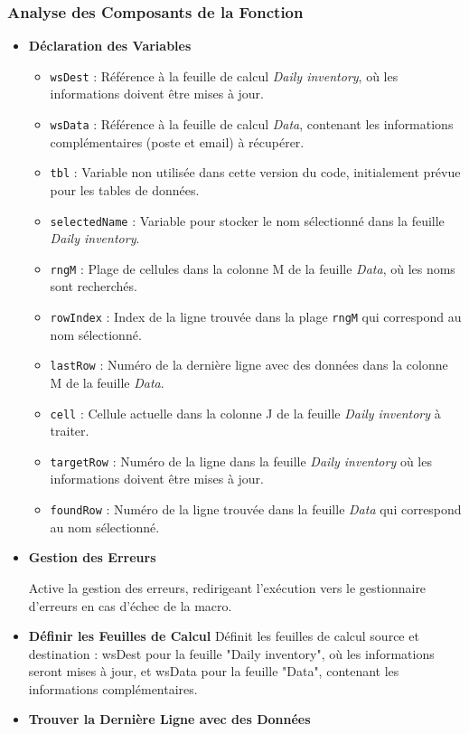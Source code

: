 \documentclass[a4paper, oneside, 12pt, final]{extreport}
\begin{document}
\subsubsection{Analyse des Composants de la Fonction}
\begin{itemize}

\item\textbf{Déclaration des Variables}

\begin{itemize}
    \item \texttt{wsDest} : Référence à la feuille de calcul \textit{Daily inventory}, où les informations doivent être mises à jour.
    \item \texttt{wsData} : Référence à la feuille de calcul \textit{Data}, contenant les informations complémentaires (poste et email) à récupérer.
    \item \texttt{tbl} : Variable non utilisée dans cette version du code, initialement prévue pour les tables de données.
    \item \texttt{selectedName} : Variable pour stocker le nom sélectionné dans la feuille \textit{Daily inventory}.
    \item \texttt{rngM} : Plage de cellules dans la colonne M de la feuille \textit{Data}, où les noms sont recherchés.
    \item \texttt{rowIndex} : Index de la ligne trouvée dans la plage \texttt{rngM} qui correspond au nom sélectionné.
    \item \texttt{lastRow} : Numéro de la dernière ligne avec des données dans la colonne M de la feuille \textit{Data}.
    \item \texttt{cell} : Cellule actuelle dans la colonne J de la feuille \textit{Daily inventory} à traiter.
    \item \texttt{targetRow} : Numéro de la ligne dans la feuille \textit{Daily inventory} où les informations doivent être mises à jour.
    \item \texttt{foundRow} : Numéro de la ligne trouvée dans la feuille \textit{Data} qui correspond au nom sélectionné.
\end{itemize}

\item\textbf{Gestion des Erreurs}

Active la gestion des erreurs, redirigeant l'exécution vers le gestionnaire d'erreurs en cas d'échec de la macro.
\item\textbf{Définir les Feuilles de Calcul}
Définit les feuilles de calcul source et destination : wsDest pour la feuille "Daily inventory", où les informations seront mises à jour, et wsData pour la feuille "Data", contenant les informations complémentaires.
\item\textbf{Trouver la Dernière Ligne avec des Données}


\end{itemize}
\end{document}
